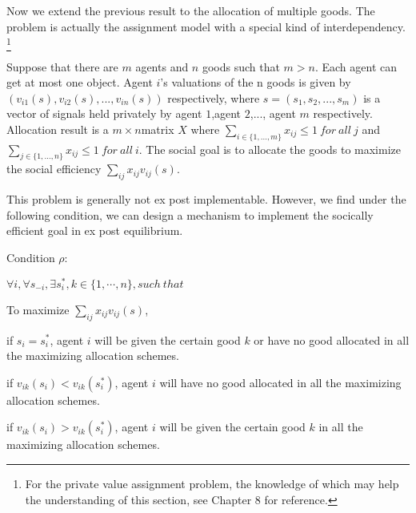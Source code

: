 Now we extend the previous result to the allocation of multiple goods.  The problem is actually the assignment model with a special kind of interdependency. \footnote{For the private value assignment problem, the knowledge of which may help the understanding of this section, see Chapter 8 \parencite{Roth1990}for reference.}

Suppose that there are $m$ agents and $n$ goods such that $m > n$. Each agent can get at most one object.   Agent $i$'s valuations of the n goods is given by $(v_{i1}(s),v_{i2}(s),...,v_{in}(s))$ respectively, where $s=(s_1,s_2,...,s_m)$ is a vector of signals held privately by agent $1$,agent $2$,..., agent $m$ respectively. Allocation result is a $m \times n$matrix $X$ where $\sum_{i\in\{1,...,m\}}x_{ij} \leq 1\ for\ all\ j$ and  $\sum_{j\in\{1,...,n\}}x_{ij} \leq 1\ for\ all\ i$. The social goal is to allocate the goods to maximize the social efficiency $\sum_{ij}x_{ij}v_{ij}(s)$.

This problem is generally not ex post implementable. However, we find under the following condition, we can design a mechanism to implement the socically efficient goal in ex post equilibrium.

Condition $\rho$:

$\forall i,\forall s_{-i}, \exists s_i^*,k \in \{1,\cdots,n\}, such\ that $

To maximize  $\sum_{ij}x_{ij}v_{ij}(s)$,

if $s_i = s_i^*$, agent $i$ will be given the certain good $k$ or have no good allocated in all the maximizing allocation schemes.

if $v_{ik}(s_i) < v_{ik}(s_i^*)$, agent $i$ will have no good allocated in all the maximizing allocation schemes.

if $v_{ik}(s_i) > v_{ik}(s_i^*)$, agent $i$ will be given the certain good $k$ in all the maximizing allocation schemes.


